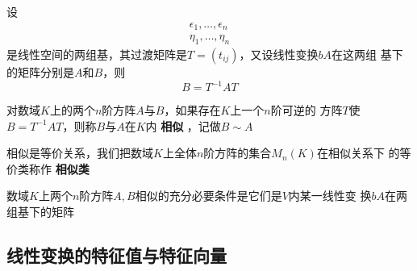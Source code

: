 \documentclass[11pt]{article}
\begin{document}
\begin{enumerate}
\begin{proposition}[]
设
\begin{align*}
\epsilon_1,\dots,\epsilon_n\\
\eta_1,\dots,\eta_n
\end{align*}
是线性空间的两组基，其过渡矩阵是\(T=(t_{ij})\)，又设线性变换\(bA\)在这两组
基下的矩阵分别是\(A\)和\(B\)，则
\begin{equation*}
B=T^{-1}AT
\end{equation*}
\end{proposition}
\end{enumerate}
\begin{definition}
对数域\(K\)上的两个\(n\)阶方阵\(A\)与\(B\)，如果存在\(K\)上一个\(n\)阶可逆的
方阵\(T\)使\(B=T^{-1}AT\)，则称\(B\)与\(A\)在\(K\)内 \textbf{相似} ，记做\(B\sim A\)
\end{definition}

相似是等价关系，我们把数域\(K\)上全体\(n\)阶方阵的集合\(M_n(K)\)在相似关系下
的等价类称作 \textbf{相似类}

\begin{proposition}[]
数域\(K\)上两个\(n\)阶方阵\(A,B\)相似的充分必要条件是它们是\(V\)内某一线性变
换\(bA\)在两组基下的矩阵
\end{proposition}
\subsection{线性变换的特征值与特征向量}
\label{sec:org50616a5}
\end{document}
